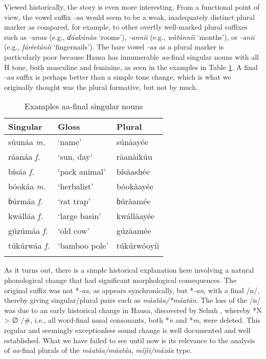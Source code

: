 \documentclass[output=paper,colorlinks,citecolor=brown]{langscibook}
\begin{document}
Viewed historically,  the story is even more interesting. From a functional point of view, the vowel suffix \textit{-aa} would seem to be a weak, inadequately distinct plural marker as compared, for example, to other overtly well-marked plural suffixes such as \textit{-unaa} (e.g., \textit{ɗáakúnàa} `rooms’), \textit{-annii} (e.g., \textit{wàtànníi} `months’), or \textit{-anii} (e.g., \textit{fárèetáníi} `fingernails’). The bare vowel \textit{-aa} as a plural marker is particularly poor because Hausa has innumerable \textit{aa}-final singular nouns with all H tone, both masculine and feminine, as seen in the examples in Table \ref{tab:AAFinalSG}. A final 
\break \textit{-aa} suffix is perhaps better than a simple tone change, which is what we originally thought was the plural formative, but not by much.   

\begin{table}
\caption{Examples aa-final singular nouns}
\label{tab:AAFinalSG}
 \begin{tabular}{lll}
  \lsptoprule
  Singular & Gloss & Plural  \\
  \midrule
súunáa \textit{m.} &`name' & súnàayée  \\
ráanáa \textit{f.} &`sun, day' & ràanàikúu  \\
bísáa \textit{f.} & `pack animal' &  bísàashée  \\
bóokáa \textit{m.}& `herbalist' & bóokàayée \\
ɓúrmáa \textit{f.} &`rat trap' & ɓúràamée\\
kwálláa \textit{f.}& `large basin'  & kwállàayée\\
gúzúmáa \textit{f.}& `old cow' &  gúzàamée\\
túkúrwáa \textit{f.}& `bamboo pole' & túkúrwóoyíi \\
  \lspbottomrule
 \end{tabular}
\end{table}

As it turns out, there is a simple historical explanation here involving a natural phonological change that had significant morphological consequences. The original suffix was not *\textit{-aa}, as appears synchronically, but *\textit{-an}, with a final /n/, thereby giving singular/plural pairs such as \textit{màatáa/*máatán}. The loss of the /n/ was due to an early historical change   in Hausa, discovered by Schuh \citeyearpar{Schuh1976}, whereby *N > ∅ /\underline{\hspace{.5cm}}\#, i.e., all word-final nasal consonants, both *\textit{n} and *\textit{m}, were deleted. This regular and seemingly exceptionless sound change is well documented and well established. What we have failed to see until now is its relevance to the analysis of \textit{aa}-final plurals of the \textit{màatáa/máatáa}, \textit{míjìi/mázáa} type.
\end{document}
